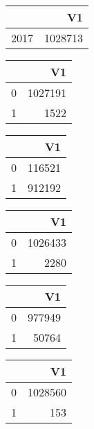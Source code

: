 \bigskip\bigskip
\centering
\begin{tabular}{rr}
  \hline
 & V1 \\ 
  \hline
2017 & 1028713 \\ 
   \hline
\end{tabular}

\bigskip\bigskip
\centering
\begin{tabular}{rr}
  \hline
 & V1 \\ 
  \hline
0 & 1027191 \\ 
  1 & 1522 \\ 
   \hline
\end{tabular}

\bigskip\bigskip
\centering
\begin{tabular}{rr}
  \hline
 & V1 \\ 
  \hline
0 & 116521 \\ 
  1 & 912192 \\ 
   \hline
\end{tabular}

\bigskip\bigskip
\centering
\begin{tabular}{rr}
  \hline
 & V1 \\ 
  \hline
0 & 1026433 \\ 
  1 & 2280 \\ 
   \hline
\end{tabular}

\bigskip\bigskip
\centering
\begin{tabular}{rr}
  \hline
 & V1 \\ 
  \hline
0 & 977949 \\ 
  1 & 50764 \\ 
   \hline
\end{tabular}

\bigskip\bigskip
\centering
\begin{tabular}{rr}
  \hline
 & V1 \\ 
  \hline
0 & 1028560 \\ 
  1 & 153 \\ 
   \hline
\end{tabular}

